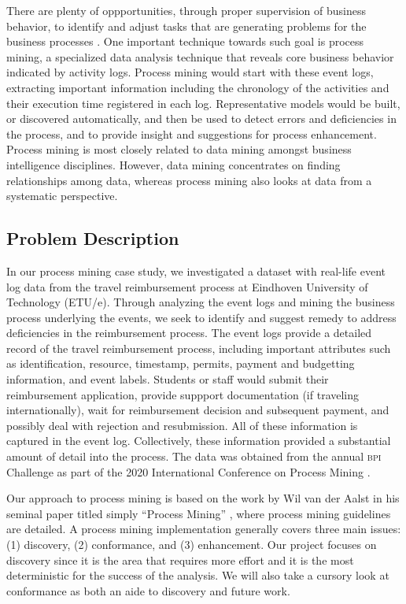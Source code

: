 \documentclass[conference]{IEEEtran}
\begin{document}
There are plenty of oppportunities, through
proper supervision of business behavior, to identify and adjust
tasks that are generating problems for the business processes
\cite{LeAl1994}.
One important technique towards such goal is process mining, a
specialized data analysis technique that reveals core business behavior
indicated by activity logs.
Process mining would start with these event logs, extracting important
information including the chronology of the activities
 and their execution time registered in each log. Representative models
would be built, or discovered automatically,
and then be used to detect errors and deficiencies in the process,
and to provide insight and suggestions for process enhancement.
Process mining is most closely related to data mining 
amongst business intelligence disciplines. However,
data mining concentrates on finding relationships among data,
whereas process mining also looks at data from a systematic
perspective.

\subsection{Problem Description}

In our process mining case study, we investigated
a dataset with
real-life event log data from the travel reimbursement process at
Eindhoven University of Technology (ETU/e). Through analyzing the event
logs and mining the business process underlying the events, we seek to
identify and suggest remedy to address deficiencies in the reimbursement
process.
The event logs provide a detailed record of the travel reimbursement process,
including important attributes such as identification, resource,
timestamp, permits, payment and budgetting information, and event labels.
Students or staff would submit their reimbursement application,
provide suppport documentation (if traveling internationally), wait for
reimbursement decision and subsequent payment, and possibly deal with
rejection and resubmission. All of these information is captured in the
event log.
Collectively, these information provided a substantial amount of detail
into the process. 
The data was obtained from 
the annual \textsc{bpi} Challenge as part of
the 2020 International Conference on Process Mining \cite{BPI2020}.

Our approach to process mining is based on the work by
Wil van der Aalst in his seminal paper titled simply
``Process Mining'' \cite{van2012},
where process mining guidelines are detailed.
A process mining implementation generally
covers three main issues: (1) discovery, (2) conformance,
and (3) enhancement.
Our project focuses on discovery since it is the area
that requires more effort and it is the most deterministic for the
success of the analysis. We will also take a cursory
look at conformance as both an aide to discovery and future work.
\end{document}
